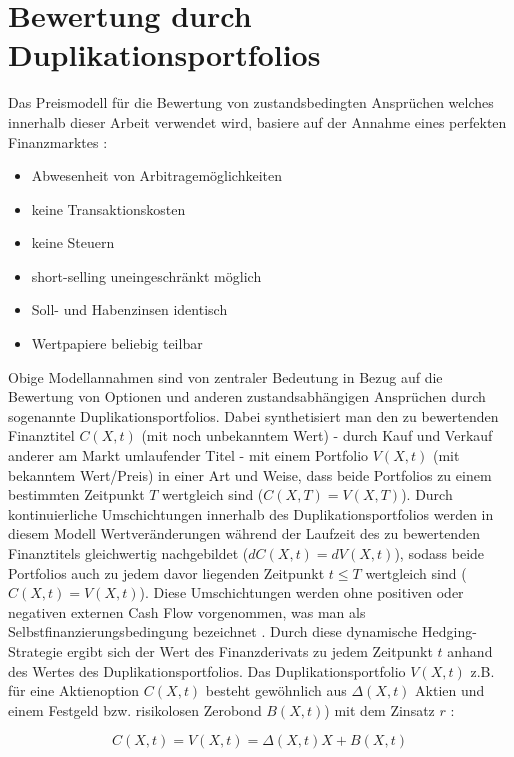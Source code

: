 \documentclass[12pt,a4paper,headsepline,bibliography=totoc,listof=totoc,headinclude=false,footinclude=false,BCOR5mm]{scrreprt} %
\begin{document}
\section{Bewertung durch Duplikationsportfolios}\label{arb}
Das Preismodell f\"ur die Bewertung von zustandsbedingten Anspr\"uchen welches innerhalb dieser Arbeit verwendet wird, basiere auf der Annahme eines perfekten Finanzmarktes  \cite[Kap. 4.1]{Franke2004} :
  \begin{itemize}
\item Abwesenheit von Arbitragem\"oglichkeiten
\item keine Transaktionskosten
\item keine Steuern 
\item short-selling uneingeschr\"ankt  m\"oglich
\item Soll- und Habenzinsen identisch
\item Wertpapiere beliebig teilbar
  \end{itemize}

Obige Modellannahmen sind von zentraler Bedeutung in Bezug auf die Bewertung von Optionen und anderen zustandsabh\"angigen Anspr\"uchen durch sogenannte Duplikationsportfolios. Dabei synthetisiert man den zu bewertenden Finanztitel $C(X,t)$ (mit noch unbekanntem Wert) - durch Kauf und Verkauf anderer am Markt umlaufender Titel - mit einem Portfolio $V(X,t)$ (mit bekanntem Wert/Preis) in einer Art und Weise, dass beide Portfolios zu einem bestimmten Zeitpunkt $T$ wertgleich sind ($C(X,T) = V(X,T)$). Durch kontinuierliche Umschichtungen innerhalb des Duplikationsportfolios werden in diesem Modell Wertver\"anderungen w\"ahrend der Laufzeit des zu bewertenden Finanztitels gleichwertig nachgebildet ($dC(X,t) = dV(X,t)$), sodass beide Portfolios auch zu jedem davor liegenden Zeitpunkt $t\le T$ wertgleich sind ($C(X,t) = V(X,t)$). Diese Umschichtungen werden ohne positiven oder negativen externen Cash Flow vorgenommen, was man als Selbstfinanzierungsbedingung  bezeichnet \cite[S.7]{Zimmermann2000}. Durch diese dynamische Hedging-Strategie ergibt sich der Wert des Finanzderivats zu jedem Zeitpunkt $t$ anhand des Wertes des Duplikationsportfolios. Das Duplikationsportfolio $V(X,t)$ z.B. f\"ur eine Aktienoption $C(X,t)$ besteht gew\"ohnlich aus $\Delta(X,t)$ Aktien und einem Festgeld bzw. risikolosen Zerobond $B(X,t)$) mit dem Zinsatz $r$ \cite[S.5]{Zimmermann2000}:

\begin{equation} \label{repli}
C(X,t) = V(X,t)=\Delta(X,t)X+B(X,t)\end{equation}
\end{document}
